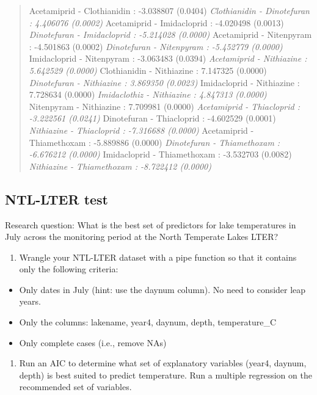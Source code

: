\documentclass[]{article}
\providecommand{\tightlist}{%
  \setlength{\itemsep}{0pt}\setlength{\parskip}{0pt}}
\begin{document}
\begin{quote}
Acetamiprid - Clothianidin : -3.038807 (0.0404)\emph{ Clothianidin -
Dinotefuran : 4.406076 (0.0002)} Acetamiprid - Imidacloprid : -4.020498
(0.0013)\emph{ Dinotefuran - Imidacloprid : -5.214028 (0.0000)}
Acetamiprid - Nitenpyram : -4.501863 (0.0002)\emph{ Dinotefuran -
Nitenpyram : -5.452779 (0.0000)} Imidacloprid - Nitenpyram : -3.063483
(0.0394)\emph{ Acetamiprid - Nithiazine : 5.642529 (0.0000)}
Clothianidin - Nithiazine : 7.147325 (0.0000)\emph{ Dinotefuran -
Nithiazine : 3.869350 (0.0023)} Imidacloprid - Nithiazine : 7.728634
(0.0000)\emph{ Imidaclothiz - Nithiazine : 4.847313 (0.0000)} Nitenpyram
- Nithiazine : 7.709981 (0.0000)\emph{ Acetamiprid - Thiacloprid :
-3.222561 (0.0241)} Dinotefuran - Thiacloprid : -4.602529 (0.0001)\emph{
Nithiazine - Thiacloprid : -7.316688 (0.0000)} Acetamiprid -
Thiamethoxam : -5.889886 (0.0000)\emph{ Dinotefuran - Thiamethoxam :
-6.676212 (0.0000)} Imidacloprid - Thiamethoxam : -3.532703
(0.0082)\emph{ Nithiazine - Thiamethoxam : -8.722412 (0.0000)}
\end{quote}

\subsection{NTL-LTER test}\label{ntl-lter-test}

Research question: What is the best set of predictors for lake
temperatures in July across the monitoring period at the North Temperate
Lakes LTER?

\begin{enumerate}
\def\labelenumi{\arabic{enumi}.}
\setcounter{enumi}{10}
\tightlist
\item
  Wrangle your NTL-LTER dataset with a pipe function so that it contains
  only the following criteria:
\end{enumerate}

\begin{itemize}
\tightlist
\item
  Only dates in July (hint: use the daynum column). No need to consider
  leap years.
\item
  Only the columns: lakename, year4, daynum, depth, temperature\_C
\item
  Only complete cases (i.e., remove NAs)
\end{itemize}

\begin{enumerate}
\def\labelenumi{\arabic{enumi}.}
\setcounter{enumi}{11}
\tightlist
\item
  Run an AIC to determine what set of explanatory variables (year4,
  daynum, depth) is best suited to predict temperature. Run a multiple
  regression on the recommended set of variables.
\end{enumerate}
\end{document}
